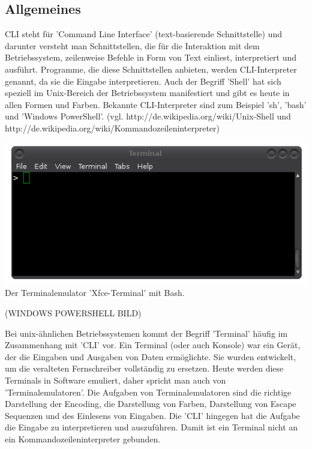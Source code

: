 \documentclass[12pt,a4paper]{report}
\begin{document}
\subsection{Allgemeines}

CLI steht für 'Command Line Interface' (text-basierende Schnittstelle) und darunter versteht man Schnittstellen, die für die Interaktion mit dem Betriebssystem, zeilenweise Befehle in Form von Text einliest, interpretiert und ausführt. Programme, die diese Schnittstellen anbieten, werden CLI-Interpreter genannt, da sie die Eingabe interpretieren. Auch der Begriff 'Shell' hat sich speziell im Unix-Bereich der Betriebssystem manifestiert und gibt es heute in allen Formen und Farben. Bekannte CLI-Interpreter sind zum Beispiel 'sh', 'bash' und 'Windows PowerShell'. (vgl. http://de.wikipedia.org/wiki/Unix-Shell und http://de.wikipedia.org/wiki/Kommandozeileninterpreter)\\

\begin{center}
\includegraphics[scale=0.5]{img/cli_pic.png}\\
Der Terminalemulator 'Xfce-Terminal' mit Bash.
\end{center}

(WINDOWS POWERSHELL BILD)

Bei unix-ähnlichen Betriebssystemen kommt der Begriff 'Terminal' häufig im Zusammenhang mit 'CLI' vor. Ein Terminal (oder auch Konsole) war ein Gerät, der die Eingaben und Ausgaben von Daten ermöglichte. Sie wurden entwickelt, um die veralteten Fernschreiber vollständig zu ersetzen. Heute werden diese Terminals in Software emuliert, daher spricht man auch von 'Terminalemulatoren'. Die Aufgaben von Terminalemulatoren sind die richtige Darstellung der Encoding, die Darstellung von Farben, Darstellung von Escape Sequenzen und des Einlesens von Eingaben. Die 'CLI' hingegen hat die Aufgabe die Eingabe zu interpretieren und auszuführen. Damit ist ein Terminal nicht an ein Kommandozeileninterpreter gebunden.\\
\end{document}
